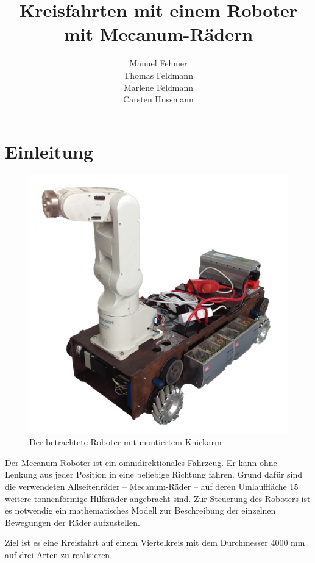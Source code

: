 \documentclass[a4paper]{article}
\title{Kreisfahrten mit einem Roboter mit Mecanum-Rädern}
\author{Manuel Fehmer \\ Thomas Feldmann \\ Marlene Feldmann \\ Carsten Hussmann}
\begin{document}
\maketitle
\newpage

\section{Einleitung}
\begin{figure}
    \centering
    \includegraphics[width=.8\textwidth]{Roboter}
    \caption{Der betrachtete Roboter mit montiertem Knickarm}
\end{figure}
Der Mecanum-Roboter ist ein omnidirektionales Fahrzeug. Er kann ohne Lenkung aus jeder Position in eine beliebige Richtung fahren. Grund dafür sind die verwendeten Allseitenräder -- Mecanum-Räder -- auf deren Umlauffläche 15 weitere tonnenförmige Hilfsräder angebracht sind. Zur Steuerung des Roboters ist es notwendig ein mathematisches Modell zur Beschreibung der einzelnen Bewegungen der Räder aufzustellen.

Ziel ist es eine Kreisfahrt auf einem Viertelkreis mit dem Durchmesser 4000 mm auf drei Arten zu realisieren.
\end{document}
